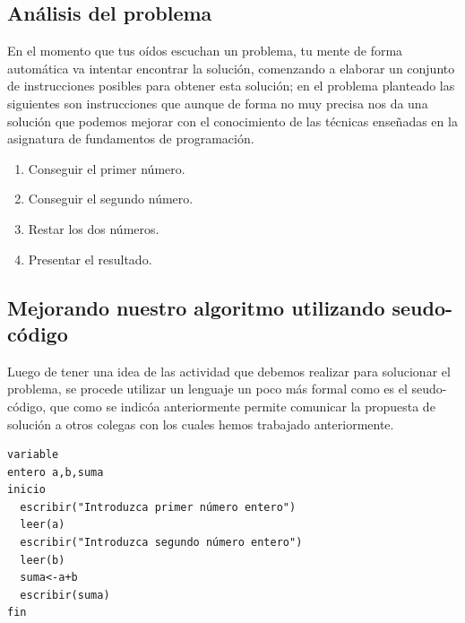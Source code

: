 \documentclass[a4paper,12pt,spanish]{article}
\begin{document}
\subsection{Análisis del problema}
\label{sec:analsis-del-problema}

En el momento que tus oídos escuchan un problema, tu mente de forma
automática va intentar encontrar la solución, comenzando a elaborar un
conjunto de instrucciones posibles para obtener esta solución; en el
problema planteado las siguientes son instrucciones que aunque de
forma no muy precisa  nos da una  solución  que podemos mejorar con el
conocimiento de las técnicas enseñadas en la asignatura de fundamentos
de programación.

  \begin{tcolorbox}[title=''Algoritmo para restar dos números'', colback=red!5!white,colframe=red!75!black,fonttitle=\bfseries]
    \begin{enumerate}
      \item Conseguir el primer número.
      \item Conseguir el segundo número.
      \item Restar los dos números.
      \item Presentar el resultado.
    \end{enumerate}

  \end{tcolorbox}




  
\subsection{Mejorando nuestro algoritmo utilizando seudo-código}
\label{sec:mejor-neustro-algor}

Luego de tener una idea de las actividad que debemos realizar para solucionar el problema, se procede utilizar un lenguaje un poco más formal como es el seudo-código, que como se indicóa anteriormente permite comunicar la propuesta de solución a otros colegas con los cuales hemos trabajado anteriormente.

  \begin{tcolorbox}[title=Algoritmo para restar de dos números, colback=red!5!white,colframe=red!75!black,fonttitle=\bfseries]
\begin{verbatim}
variable
entero a,b,suma
inicio
  escribir("Introduzca primer número entero")
  leer(a)
  escribir("Introduzca segundo número entero")
  leer(b)
  suma<-a+b
  escribir(suma)
fin
\end{verbatim}
  \end{tcolorbox}
\end{document}
